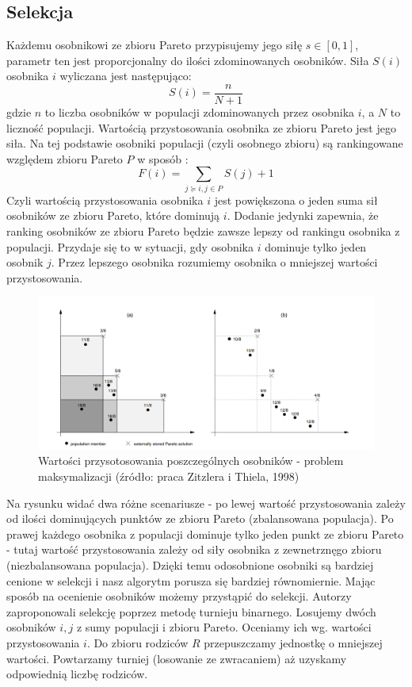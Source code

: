 \documentclass[a4paper]{article}
\begin{document}
\subsection{Selekcja}
Każdemu osobnikowi ze zbioru Pareto przypisujemy jego siłę $s \in [0,1]$, parametr ten jest proporcjonalny do ilości zdominowanych osobników. Siła $S(i)$ osobnika $i$ wyliczana jest następująco: $$S(i) = \frac{n}{N + 1}$$gdzie $n$ to liczba osobników w populacji zdominowanych przez osobnika $i$, a $N$ to liczność populacji. Wartością przystosowania osobnika ze zbioru Pareto jest jego siła.
Na tej podstawie osobniki populacji (czyli osobnego zbioru) są rankingowane względem zbioru Pareto $P$ w sposób : $$F(i) =  \sum_{j \succeq  i, j \in P}S(j) + 1$$
Czyli wartością przystosowania osobnika $i$ jest powiększona o jeden suma sił osobników ze zbioru Pareto, które dominują $i$. Dodanie jedynki zapewnia, że ranking osobników ze zbioru Pareto będzie zawsze lepszy od rankingu osobnika z populacji. Przydaje się to w sytuacji, gdy osobnika $i$ dominuje tylko jeden osobnik $j$. Przez lepszego osobnika rozumiemy osobnika o mniejszej wartości przystosowania.
\newpage
\begin{figure}[htbp]{}
\centerline{\includegraphics[scale=.35]{strength.png}}
\caption{Wartości przysotosowania poszczególnych osobników - problem maksymalizacji (źródło: praca Zitzlera i Thiela, 1998)}
\label{fig:sila}
\end{figure}
Na rysunku widać dwa różne scenariusze - po lewej wartość przystosowania zależy od ilości dominujących punktów ze zbioru Pareto (zbalansowana populacja). Po prawej każdego osobnika z populacji dominuje tylko jeden punkt ze zbioru Pareto - tutaj wartość przystosowania zależy od siły osobnika z zewnetrznęgo zbioru (niezbalansowana populacja). Dzięki temu odosobnione osobniki są bardziej cenione w selekcji i nasz algorytm porusza się bardziej równomiernie.
Mając sposób na ocenienie osobników możemy przystąpić do selekcji. Autorzy zaproponowali selekcję poprzez metodę turnieju binarnego. Losujemy dwóch osobników $i,j$ z sumy populacji i zbioru Pareto. Oceniamy ich wg. wartości przystosowania $i$. Do zbioru rodziców $R$ przepuszczamy jednostkę o mniejszej wartości. Powtarzamy turniej (losowanie ze zwracaniem) aż uzyskamy odpowiednią liczbę rodziców. 
\end{document}
